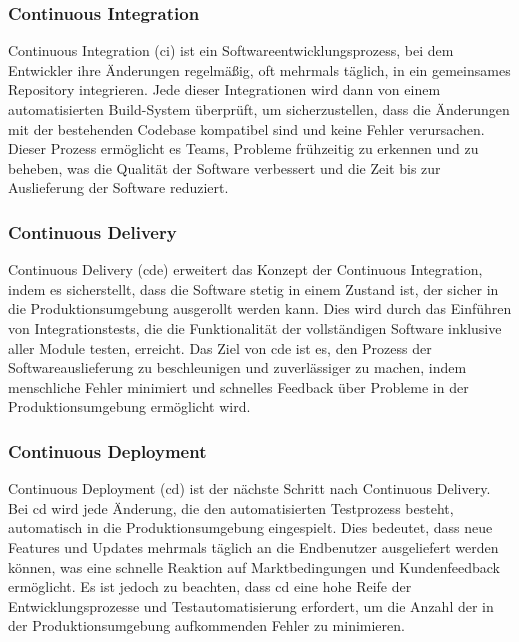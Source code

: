 \subsubsection{Continuous Integration}

Continuous Integration (\acrshort{ci}) ist ein Softwareentwicklungsprozess, bei dem Entwickler ihre Änderungen regelmäßig,
oft mehrmals täglich, in ein gemeinsames Repository integrieren.
Jede dieser Integrationen wird dann von einem automatisierten Build-System überprüft, um sicherzustellen, dass die
Änderungen mit der bestehenden Codebase kompatibel sind und keine Fehler verursachen.
Dieser Prozess ermöglicht es Teams, Probleme frühzeitig zu erkennen und zu beheben, was die Qualität der Software
verbessert und die Zeit bis zur Auslieferung der Software reduziert.

\subsubsection{Continuous Delivery}

Continuous Delivery (\acrshort{cde}) erweitert das Konzept der Continuous Integration, indem es sicherstellt, dass die
Software stetig in einem Zustand ist, der sicher in die Produktionsumgebung ausgerollt werden kann.
Dies wird durch das Einführen von Integrationstests, die die Funktionalität der vollständigen Software inklusive aller
Module testen, erreicht.
Das Ziel von \acrshort{cde} ist es, den Prozess der Softwareauslieferung zu beschleunigen und zuverlässiger zu machen, indem
menschliche Fehler minimiert und schnelles Feedback über Probleme in der Produktionsumgebung ermöglicht wird.

\subsubsection{Continuous Deployment}

Continuous Deployment (\acrshort{cd}) ist der nächste Schritt nach Continuous Delivery.
Bei \acrshort{cd} wird jede Änderung, die den automatisierten Testprozess besteht, automatisch in die Produktionsumgebung
eingespielt.
Dies bedeutet, dass neue Features und Updates mehrmals täglich an die Endbenutzer ausgeliefert werden können, was eine
schnelle Reaktion auf Marktbedingungen und Kundenfeedback ermöglicht.
Es ist jedoch zu beachten, dass \acrshort{cd} eine hohe Reife der Entwicklungsprozesse und Testautomatisierung erfordert, um
die Anzahl der in der Produktionsumgebung aufkommenden Fehler zu minimieren.

